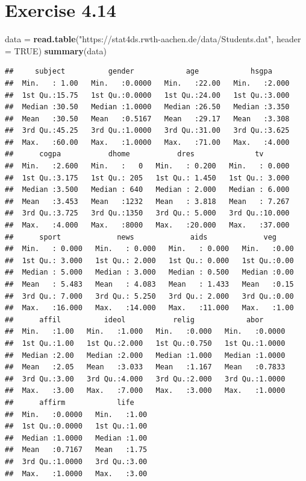 \documentclass[
]{article}
\newenvironment{Shaded}{\begin{snugshade}}{\end{snugshade}}
\newcommand{\AttributeTok}[1]{\textcolor[rgb]{0.13,0.29,0.53}{#1}}
\newcommand{\ConstantTok}[1]{\textcolor[rgb]{0.56,0.35,0.01}{#1}}
\newcommand{\FunctionTok}[1]{\textcolor[rgb]{0.13,0.29,0.53}{\textbf{#1}}}
\newcommand{\NormalTok}[1]{#1}
\newcommand{\OtherTok}[1]{\textcolor[rgb]{0.56,0.35,0.01}{#1}}
\newcommand{\StringTok}[1]{\textcolor[rgb]{0.31,0.60,0.02}{#1}}
\begin{document}
\hypertarget{exercise-4.14}{%
\section{Exercise 4.14}\label{exercise-4.14}}

\begin{Shaded}
\begin{Highlighting}[]
\NormalTok{data }\OtherTok{=} \FunctionTok{read.table}\NormalTok{(}\StringTok{"https://stat4ds.rwth{-}aachen.de/data/Students.dat"}\NormalTok{, }\AttributeTok{header =} \ConstantTok{TRUE}\NormalTok{)}
\FunctionTok{summary}\NormalTok{(data)}
\end{Highlighting}
\end{Shaded}

\begin{verbatim}
##     subject          gender            age            hsgpa      
##  Min.   : 1.00   Min.   :0.0000   Min.   :22.00   Min.   :2.000  
##  1st Qu.:15.75   1st Qu.:0.0000   1st Qu.:24.00   1st Qu.:3.000  
##  Median :30.50   Median :1.0000   Median :26.50   Median :3.350  
##  Mean   :30.50   Mean   :0.5167   Mean   :29.17   Mean   :3.308  
##  3rd Qu.:45.25   3rd Qu.:1.0000   3rd Qu.:31.00   3rd Qu.:3.625  
##  Max.   :60.00   Max.   :1.0000   Max.   :71.00   Max.   :4.000  
##      cogpa           dhome           dres              tv        
##  Min.   :2.600   Min.   :   0   Min.   : 0.200   Min.   : 0.000  
##  1st Qu.:3.175   1st Qu.: 205   1st Qu.: 1.450   1st Qu.: 3.000  
##  Median :3.500   Median : 640   Median : 2.000   Median : 6.000  
##  Mean   :3.453   Mean   :1232   Mean   : 3.818   Mean   : 7.267  
##  3rd Qu.:3.725   3rd Qu.:1350   3rd Qu.: 5.000   3rd Qu.:10.000  
##  Max.   :4.000   Max.   :8000   Max.   :20.000   Max.   :37.000  
##      sport             news             aids             veg      
##  Min.   : 0.000   Min.   : 0.000   Min.   : 0.000   Min.   :0.00  
##  1st Qu.: 3.000   1st Qu.: 2.000   1st Qu.: 0.000   1st Qu.:0.00  
##  Median : 5.000   Median : 3.000   Median : 0.500   Median :0.00  
##  Mean   : 5.483   Mean   : 4.083   Mean   : 1.433   Mean   :0.15  
##  3rd Qu.: 7.000   3rd Qu.: 5.250   3rd Qu.: 2.000   3rd Qu.:0.00  
##  Max.   :16.000   Max.   :14.000   Max.   :11.000   Max.   :1.00  
##      affil          ideol           relig            abor       
##  Min.   :1.00   Min.   :1.000   Min.   :0.000   Min.   :0.0000  
##  1st Qu.:1.00   1st Qu.:2.000   1st Qu.:0.750   1st Qu.:1.0000  
##  Median :2.00   Median :2.000   Median :1.000   Median :1.0000  
##  Mean   :2.05   Mean   :3.033   Mean   :1.167   Mean   :0.7833  
##  3rd Qu.:3.00   3rd Qu.:4.000   3rd Qu.:2.000   3rd Qu.:1.0000  
##  Max.   :3.00   Max.   :7.000   Max.   :3.000   Max.   :1.0000  
##      affirm            life     
##  Min.   :0.0000   Min.   :1.00  
##  1st Qu.:0.0000   1st Qu.:1.00  
##  Median :1.0000   Median :1.00  
##  Mean   :0.7167   Mean   :1.75  
##  3rd Qu.:1.0000   3rd Qu.:3.00  
##  Max.   :1.0000   Max.   :3.00
\end{verbatim}
\end{document}
